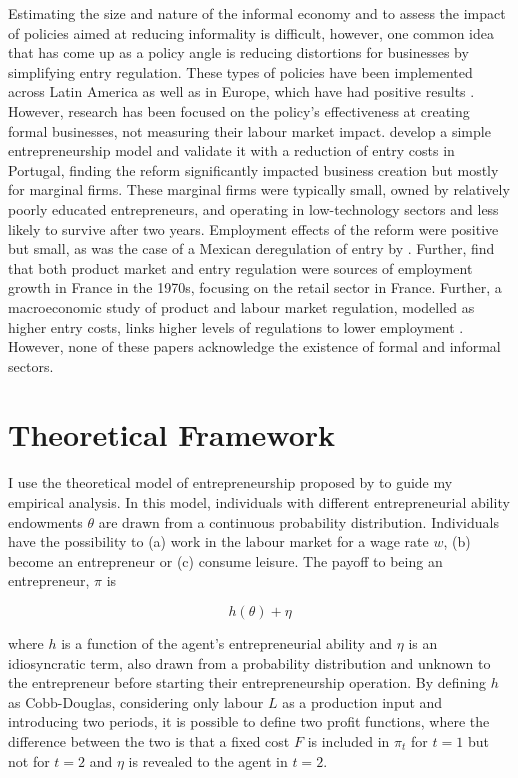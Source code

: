 \documentclass[11pt,a4paper]{article}\usepackage[]{graphicx}\usepackage[]{xcolor}
\begin{document}
Estimating the size and nature of the informal economy and to assess the impact of policies aimed at reducing informality is difficult, however, one common idea that has come up as a policy angle is reducing distortions for businesses by simplifying entry regulation. These types of policies have been implemented across Latin America as well as in Europe, which have had positive results \parencite{Oviedo.2009}. However, research has been focused on the policy's effectiveness at creating formal businesses, not measuring their labour market impact. \textcite{Branstetter.2014} develop a simple entrepreneurship model and validate it with a reduction of entry costs in Portugal, finding the reform significantly impacted business creation but mostly for marginal firms. These marginal firms were typically small, owned by relatively poorly educated entrepreneurs, and operating in low-technology sectors and less likely to survive after two years. Employment effects of the reform were positive but small, as was the case of a Mexican deregulation of entry by \textcite{Kaplan.2011}. Further, \textcite{Bertrand.2002} find that both product market and entry regulation were sources of employment growth in France in the 1970s, focusing on the retail sector in France. Further, a macroeconomic study of product and labour market regulation, modelled as higher entry costs, links higher levels of regulations to lower employment \parencite{Blanchard.2003}. However, none of these papers acknowledge the existence of formal and informal sectors.

\section{Theoretical Framework}

I use the theoretical model of entrepreneurship proposed by \textcite{Branstetter.2014} to guide my empirical analysis. In this model, individuals with different entrepreneurial ability endowments $\theta$ are drawn from a continuous probability distribution. Individuals have the possibility to (a) work in the labour market for a wage rate $w$, (b) become an entrepreneur or (c) consume leisure. The payoff to being an entrepreneur, $\pi$ is

\begin{equation}
  h(\theta) + \eta
\end{equation}

where $h$ is a function of the agent's entrepreneurial ability and $\eta$ is an idiosyncratic term, also drawn from a probability distribution and unknown to the entrepreneur before starting their entrepreneurship operation. By defining $h$ as Cobb-Douglas, considering only labour $L$ as a production input and introducing two periods, it is possible to define two profit functions, where the difference between the two is that a fixed cost $F$ is included in $\pi_t$ for $t = 1$ but not for $t=2$ and $\eta$ is revealed to the agent in $t=2$. 
\end{document}

